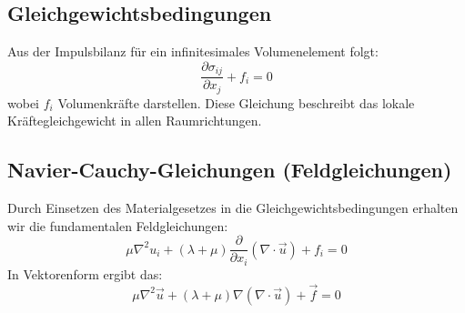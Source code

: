 \subsection{Gleichgewichtsbedingungen}
Aus der Impulsbilanz für ein infinitesimales Volumenelement folgt:
	\begin{equation}
		\frac{\partial \sigma_{ij}}{\partial x_j} + f_i =
		0
\end{equation}
wobei $f_i$ Volumenkräfte darstellen. 
Diese Gleichung beschreibt das lokale Kräftegleichgewicht in allen Raumrichtungen.

\subsection{Navier-Cauchy-Gleichungen (Feldgleichungen)}
Durch Einsetzen des Materialgesetzes in die Gleichgewichtsbedingungen erhalten wir die fundamentalen Feldgleichungen:
	\begin{equation}
		\mu \nabla^2 u_i + (\lambda + \mu) \frac{\partial}{\partial x_i} (\nabla \cdot \vec{u}) + f_i =
		0
	\end{equation}
In Vektorenform ergibt das:
	\begin{equation}
		\mu \nabla^2 \vec{u} + (\lambda + \mu) \nabla (\nabla \cdot \vec{u}) + \vec{f} = 
		0
	\end{equation}

